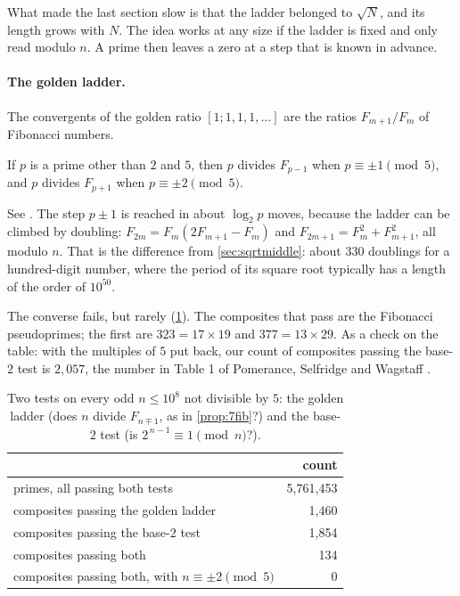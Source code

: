 \addednote{\revG}

What made the last section slow is that the ladder belonged to $\sqrt N$, and its length grows with
$N$. The idea works at any size if the ladder is fixed and only read modulo $n$. A prime then leaves a
zero at a step that is known in advance.

\paragraph{The golden ladder.} The convergents of the golden ratio $[1;1,1,1,\ldots]$ are the ratios
$F_{m+1}/F_m$ of Fibonacci numbers.

\begin{proposition}[classical]\label{prop:7fib}
If $p$ is a prime other than $2$ and $5$, then $p$ divides $F_{p-1}$ when $p\equiv\pm1\pmod5$, and $p$
divides $F_{p+1}$ when $p\equiv\pm2\pmod5$.
\end{proposition}

See \citep{BaillieWagstaff1980}. The step $p\pm1$ is reached in about $\log_2p$ moves, because the ladder can be
climbed by doubling: $F_{2m}=F_m(2F_{m+1}-F_m)$ and $F_{2m+1}=F_m^{2}+F_{m+1}^{2}$, all modulo $n$. That
is the difference from \cref{sec:sqrtmiddle}: about $330$ doublings for a hundred-digit number,
where the period of its square root typically has a length of the order of $10^{50}$.

The converse fails, but rarely (\cref{tab:7ladder}). The composites that pass are the Fibonacci
pseudoprimes; the first are $323=17\times19$ and $377=13\times29$. As a check on the table: with the
multiples of $5$ put back, our count of composites passing the base-$2$ test is $2{,}057$, the number
in Table 1 of Pomerance, Selfridge and Wagstaff \citep{PomeranceSelfridgeWagstaff1980}.

\begin{table}[t]
\centering
\caption[The golden ladder and the base-2 test]{Two tests on every odd $n\le10^{8}$ not divisible by $5$: the golden ladder (does $n$ divide
$F_{n\mp1}$, as in \cref{prop:7fib}?) and the base-$2$ test (is $2^{\,n-1}\equiv1\pmod n$?).}\label{tab:7ladder}
\small
\begin{tabular}{lr}
\toprule
 & count\\
\midrule
primes, all passing both tests & 5{,}761{,}453\\
composites passing the golden ladder & 1{,}460\\
composites passing the base-$2$ test & 1{,}854\\
composites passing both & 134\\
composites passing both, with $n\equiv\pm2\pmod5$ & 0\\
\bottomrule
\end{tabular}
\end{table}


